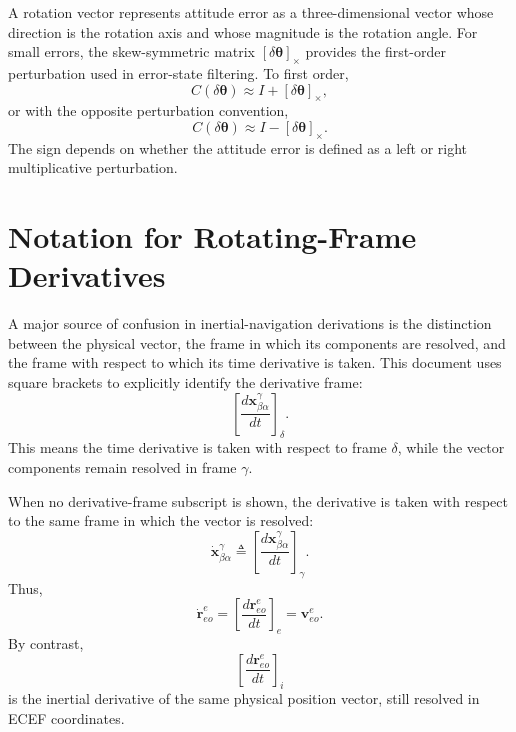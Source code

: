 \documentclass[11pt,oneside]{book}
\begin{document}
A rotation vector represents attitude error as a three-dimensional vector whose direction is the rotation axis and whose magnitude is the rotation angle. For small errors, the skew-symmetric matrix $[\delta\boldsymbol{\theta}]_\times$ provides the first-order perturbation used in error-state filtering. To first order,
\begin{equation}
C(\delta\boldsymbol{\theta})
\approx
I + [\delta\boldsymbol{\theta}]_\times,
\end{equation}
or with the opposite perturbation convention,
\begin{equation}
C(\delta\boldsymbol{\theta})
\approx
I - [\delta\boldsymbol{\theta}]_\times.
\end{equation}
The sign depends on whether the attitude error is defined as a left or right multiplicative perturbation.

\section{Notation for Rotating-Frame Derivatives}

A major source of confusion in inertial-navigation derivations is the distinction between the physical vector, the frame in which its components are resolved, and the frame with respect to which its time derivative is taken. This document uses square brackets to explicitly identify the derivative frame:
\begin{equation}
\left[
\frac{d\mathbf{x}_{\beta\alpha}^{\gamma}}{dt}
\right]_{\delta}.
\end{equation}
This means the time derivative is taken with respect to frame $\delta$, while the vector components remain resolved in frame $\gamma$.

When no derivative-frame subscript is shown, the derivative is taken with respect to the same frame in which the vector is resolved:
\begin{equation}
\dot{\mathbf{x}}_{\beta\alpha}^{\gamma}
\triangleq
\left[
\frac{d\mathbf{x}_{\beta\alpha}^{\gamma}}{dt}
\right]_{\gamma}.
\end{equation}
Thus,
\begin{equation}
\dot{\mathbf{r}}_{eo}^{e}
=
\left[
\frac{d\mathbf{r}_{eo}^{e}}{dt}
\right]_{e}
=
\mathbf{v}_{eo}^{e}.
\end{equation}
By contrast,
\begin{equation}
\left[
\frac{d\mathbf{r}_{eo}^{e}}{dt}
\right]_{i}
\end{equation}
is the inertial derivative of the same physical position vector, still resolved in ECEF coordinates.
\end{document}
